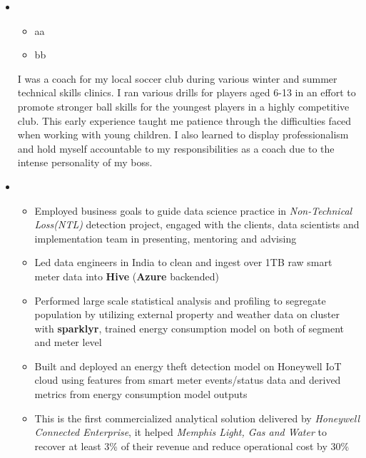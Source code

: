 \documentclass[11pt,a4paper,sans]{moderncv}        %
\begin{document}
\begin{itemize}

	\item{
		{\vspace{3pt}
			\begin{itemize}
				\item aa
				\item bb
			\end{itemize}
			I was a coach for my local soccer club during various winter and summer technical skills clinics. I ran various drills for players aged 6-13 in an effort to promote stronger ball skills for the youngest players in a highly competitive club. This early experience taught me patience through the difficulties faced when working with young children. I also learned to display professionalism and hold myself accountable to my responsibilities as a coach due to the intense personality of my boss. }}

	\vspace{4pt}

	\item{
		{\vspace{3pt}
			\begin{itemize}
				\item Employed business goals to guide data science practice in \emph{Non-Technical Loss(NTL)} detection project, engaged with the clients, data scientists and implementation team in presenting, mentoring and advising 
				\item Led data engineers in India to clean and ingest over 1TB raw smart meter data into \textbf{Hive} (\textbf{Azure} backended)
				\item Performed large scale statistical analysis and profiling to segregate population by utilizing external property and weather data on cluster with \textbf{sparklyr}, trained energy consumption model on both of segment and meter level
				\item Built and deployed an energy theft detection model on Honeywell IoT cloud using features from smart meter events/status data and derived metrics from energy consumption model outputs
				\item This is the first commercialized analytical solution delivered by \emph{Honeywell Connected Enterprise}, it helped \emph{Memphis Light, Gas and Water} to recover at least 3\% of their revenue and reduce operational cost by 30\%
			\end{itemize}}}


\end{itemize}
\end{document}
